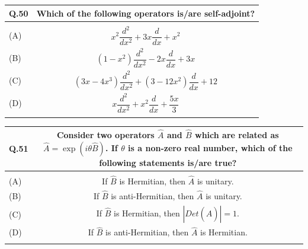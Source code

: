 \documentclass[12pt,a4paper]{article}
\begin{document}
\vspace{0.4cm}

\begin{table}[h!]
\begin{tabular}{|L|C|}
\hline
Q.50 &
Which of the following operators is/are self-adjoint? \\
\hline
 & \\
\hline
(A) & \rule{0pt}{1.2cm} $x^2\dfrac{d^2}{dx^2} + 3x\dfrac{d}{dx} + x^2$ \\
\hline
(B) & \rule{0pt}{1.2cm} $(1-x^2)\dfrac{d^2}{dx^2} - 2x\dfrac{d}{dx} + 3x$ \\
\hline
(C) & \rule{0pt}{1.2cm} $(3x - 4x^3)\dfrac{d^2}{dx^2} + (3 - 12x^2)\dfrac{d}{dx} + 12$ \\
\hline
(D) & \rule{0pt}{1.2cm}$x\dfrac{d^2}{dx^2} + x^2\dfrac{d}{dx} + \dfrac{5x}{3}$ \\
\hline
 & \\
\hline
\end{tabular}
\end{table}

\vspace{0.4cm}

\begin{table}[h!]
\begin{tabular}{|L|C|}
\hline
Q.51 &
Consider two operators $\hat{A}$ and $\hat{B}$ which are related as
$\hat{A} = \exp(i\theta\hat{B})$. If $\theta$ is a non-zero real number, which of the
following statements is/are true? \\
\hline
 & \\
\hline
(A) & If $\hat{B}$ is Hermitian, then $\hat{A}$ is unitary. \\
\hline
(B) & If $\hat{B}$ is anti-Hermitian, then $\hat{A}$ is unitary. \\
\hline
(C) & If $\hat{B}$ is Hermitian, then $|Det(\hat{A})| = 1$. \\
\hline
(D) & If $\hat{B}$ is anti-Hermitian, then $\hat{A}$ is Hermitian. \\
\hline
 & \\
\hline
\end{tabular}
\end{table}

\clearpage
\end{document}
